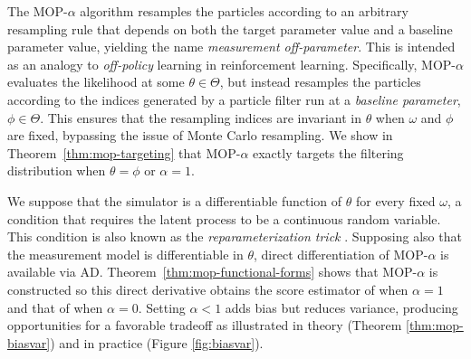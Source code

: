 \documentclass[9pt,twocolumn,pnasresearcharticle]{pnas-new}
\begin{document}
The MOP-$\alpha$ algorithm resamples the particles according to an arbitrary resampling rule that depends on both the target parameter value and a baseline parameter value, yielding the name {\it measurement off-parameter}.
This is intended as an analogy to {\it off-policy} learning in reinforcement learning.
Specifically, MOP-$\alpha$ evaluates the likelihood at some $\theta \in \Theta$, but instead resamples the particles according to the indices generated by a particle filter run at a {\it baseline parameter}, $\phi \in \Theta$.
This ensures that the resampling indices are invariant in $\theta$ when $\omega$ and $\phi$ are fixed, bypassing the issue of Monte Carlo resampling.
We show in Theorem~\ref{thm:mop-targeting} that MOP-$\alpha$ exactly targets the filtering distribution when $\theta=\phi$ or $\alpha=1$.

We suppose that the simulator is a differentiable function of $\theta$ for every fixed $\omega$, a condition that requires the latent process to be a continuous random variable. 
This condition is also known as the {\it reparameterization trick} \cite{corenflos21}.
Supposing also that the measurement model is differentiable in $\theta$, direct differentiation of MOP-$\alpha$ is available via AD.
Theorem~\ref{thm:mop-functional-forms} shows that MOP-$\alpha$ is constructed so this direct derivative obtains the score estimator of  \cite{poyiadjis11, scibior21} when $\alpha=1$ and that of \cite{naesseth18} when $\alpha=0$.
Setting $\alpha<1$ adds bias but reduces variance, producing opportunities for a favorable tradeoff as illustrated in theory (Theorem \ref{thm:mop-biasvar}) and in practice (Figure \ref{fig:biasvar}).
\end{document}

